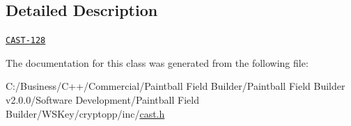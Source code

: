 \subsection{Detailed Description}
\href{http://www.weidai.com/scan-mirror/cs.html#CAST-128}{\tt CAST-\/128} 

The documentation for this class was generated from the following file:\begin{DoxyCompactItemize}
\item 
C:/Business/C++/Commercial/Paintball Field Builder/Paintball Field Builder v2.0.0/Software Development/Paintball Field Builder/WSKey/cryptopp/inc/\hyperlink{cast_8h}{cast.h}\end{DoxyCompactItemize}
